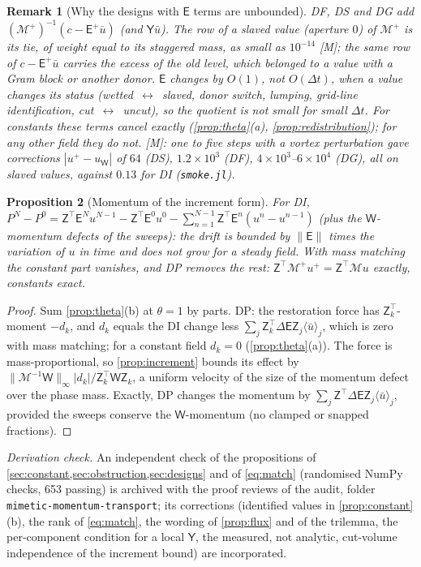 \documentclass[11pt,a4paper]{article}
\newtheorem{proposition}{Proposition}
\newtheorem{remark}[proposition]{Remark}
\newcommand{\meas}{\textsf{[M]}}
\newcommand{\code}[1]{\texttt{#1}}
\newcommand{\dt}{\Delta t}
\newcommand{\MM}{\mathcal M}
\newcommand{\W}{\mathsf W}
\newcommand{\E}{\mathsf E}
\newcommand{\Z}{\mathsf Z}
\newcommand{\Y}{\mathsf Y}
\newcommand{\ubar}{\bar u}
\begin{document}
\begin{remark}[Why the designs with $\E$ terms are unbounded]\label{rem:unbounded}
DF, DS and DG add $(\MM^+)^{-1}(c-\E^+\ubar)$ (and $\Y\ubar$).  The row of a slaved value
(aperture $0$) of $\MM^+$ is its tie, of weight equal to its staggered mass, as small as
$10^{-14}$ \meas; the same row of $c-\E^+\ubar$ carries the excess of the old level, which
belonged to a value with a Gram block or another donor.  $\E$ changes by $O(1)$, not
$O(\dt)$, when a value changes its status (wetted~$\leftrightarrow$~slaved, donor switch,
lumping, grid-line identification, cut~$\leftrightarrow$~uncut), so the quotient is not
small for small $\dt$.  For constants these terms cancel exactly
(\cref{prop:theta}(a), \cref{prop:redistribution}); for any other field they do not.
\meas: one to five steps with a vortex perturbation gave corrections $|u^+-u_\W|$ of $64$
(DS), $1.2\times10^{3}$ (DF), $4\times10^{3}$--$6\times10^4$ (DG), all on slaved values,
against $0.13$ for DI (\code{smoke.jl}).
\end{remark}

\begin{proposition}[Momentum of the increment form]\label{prop:di-momentum}
For DI, $P^{N}-P^{0}=\Z^\top\E^{N}u^{N-1}-\Z^\top\E^{0}u^{0}-\sum_{n=1}^{N-1}\Z^\top\E^{n}(u^{n}-u^{n-1})$
(plus the $\W$-momentum defects of the sweeps): the drift is bounded by $\|\E\|$ times the
variation of $u$ in time and does not grow for a steady field.  With mass matching the
constant part vanishes, and DP removes the rest: $\Z^\top\MM^+u^+=\Z^\top\MM u$ exactly,
constants exact.
\end{proposition}
\begin{proof}
Sum \cref{prop:theta}(b) at $\theta=1$ by parts.  DP: the restoration force has
$\Z_k^\top$-moment $-d_k$, and $d_k$ equals the DI change less
$\sum_j\Z_k^\top\Delta\E\Z_j\langle\ubar\rangle_j$, which is zero with mass matching; for a
constant field $d_k=0$ (\cref{prop:theta}(a)).  The force is mass-proportional, so
\cref{prop:increment} bounds its effect by $\|\MM^{-1}\W\|_\infty|d_k|/\Z_k^\top\W\Z_k$, a
uniform velocity of the size of the momentum defect over the phase mass.  Exactly, DP
changes the momentum by $\sum_j\Z^\top\Delta\E\Z_j\langle\ubar\rangle_j$, provided the sweeps
conserve the $\W$-momentum (no clamped or snapped fractions).
\end{proof}

\emph{Derivation check.} An independent check of the propositions of
\cref{sec:constant,sec:obstruction,sec:designs} and of \eqref{eq:match} (randomised NumPy
checks, 653 passing) is archived with the proof reviews of the audit, folder
\code{mimetic-momentum-transport}; its corrections
(identified values in \cref{prop:constant}(b), the rank of \eqref{eq:match}, the wording of
\cref{prop:flux} and of the trilemma, the per-component condition for a local $\Y$, the
measured, not analytic, cut-volume independence of the increment bound) are incorporated.
\end{document}

